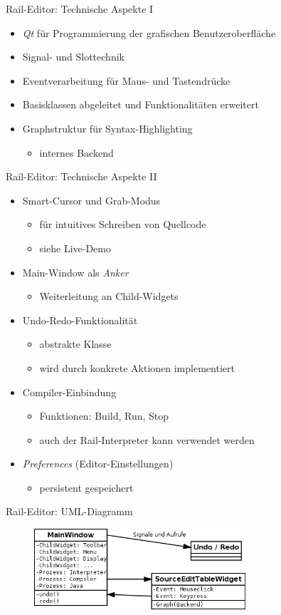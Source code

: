 \begin{frame}{Rail-Editor: Technische Aspekte I}
	\pause
	\begin{itemize}
		\item \textit{Qt} für Programmierung der grafischen Benutzeroberfläche
		\pause
		\item Signal- und Slottechnik
		\pause
		\item Eventverarbeitung für Maus- und Tastendrücke
		\pause
		\item Basisklassen abgeleitet und Funktionalitäten erweitert
		\pause
		\item Graphstruktur für Syntax-Highlighting
		\begin{itemize}
			\item internes Backend
		\end{itemize}
	\end{itemize}
\end{frame}

\begin{frame}{Rail-Editor: Technische Aspekte II}
	\pause
	\begin{itemize}
	\item Smart-Cursor und Grab-Modus
		\begin{itemize}
			\item für intuitives Schreiben von Quellcode
			\item siehe Live-Demo
		\end{itemize}
		\pause
		\item Main-Window als \textit{Anker}
		\begin{itemize}
			\item Weiterleitung an Child-Widgets
		\end{itemize}
		\pause
		\item Undo-Redo-Funktionalität
		\begin{itemize}
			\item abstrakte Klasse
			\item wird durch konkrete Aktionen implementiert
		\end{itemize}
		\pause
		\item Compiler-Einbindung
		\begin{itemize}
			\item Funktionen: Build, Run, Stop
			\item auch der Rail-Interpreter kann verwendet werden
		\end{itemize}
		\pause
		\item \textit{Preferences} (Editor-Einstellungen)
		\begin{itemize}
			\item persistent gespeichert
		\end{itemize}
	\end{itemize}
\end{frame}	

\begin{frame}{Rail-Editor: UML-Diagramm}	
	\begin{figure}
		\centering
		\includegraphics[width=0.7\textwidth]{editor-uebersicht}
	\end{figure}
\end{frame}
